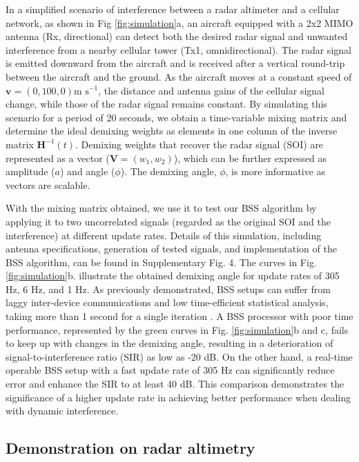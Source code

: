 \documentclass[pdflatex,mathphys]{sty}%
\begin{document}
In a simplified scenario of interference between a radar altimeter and a cellular network, as shown in Fig \ref{fig:simulation}a, an aircraft equipped with a 2x2 MIMO antenna (Rx, directional) can detect both the desired radar signal and unwanted interference from a nearby cellular tower (Tx1, omnidirectional). The radar signal is emitted downward from the aircraft and is received after a vertical round-trip between the aircraft and the ground. As the aircraft moves at a constant speed of $\textbf{v}=(0,100,0) \textrm{m s}^{-1}$, the distance and antenna gains of the cellular signal change, while those of the radar signal remains constant. By simulating this scenario for a period of 20 seconds, we obtain a time-variable mixing matrix and determine the ideal demixing weights as elements in one column of the inverse matrix $\textbf{H}^{-1}(t)$. Demixing weights that recover the radar signal (SOI) are represented as a vector ($\textbf{V}=(w_1,w_2)$), which can be further expressed as amplitude ($a$) and angle ($\phi$). The demixing angle, $\phi$, is more informative as vectors are scalable.

With the mixing matrix obtained, we use it to test our BSS algorithm by applying it to two uncorrelated signals (regarded as the original SOI and the interference) at different update rates. Details of this simulation, including antenna specifications, generation of tested signals, and implementation of the BSS algorithm, can be found in Supplementary Fig. 4. The curves in Fig. \ref{fig:simulation}b. illustrate the obtained demixing angle for update rates of 305 Hz, 6 Hz, and 1 Hz. As previously demonstrated, BSS setups can suffer from laggy inter-device communications and low time-efficient statistical analysis, taking more than 1 second for a single iteration \cite{zhang2022broadband}. A BSS processor with poor time performance, represented by the green curves in Fig. \ref{fig:simulation}b and c, fails to keep up with changes in the demixing angle, resulting in a deterioration of signal-to-interference ratio (SIR) as low as -20 dB. On the other hand, a real-time operable BSS setup with a fast update rate of 305 Hz can significantly reduce error and enhance the SIR to at least 40 dB. This comparison demonstrates the significance of a higher update rate in achieving better performance when dealing with dynamic interference.

\subsection{Demonstration on radar altimetry}
\end{document}
